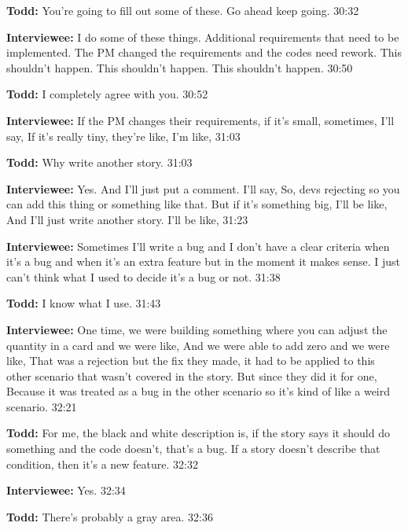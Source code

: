 \textbf{Todd:} You're going to fill out some of these. Go ahead keep going. 30:32

\textbf{Interviewee:} I do some of these things. Additional requirements that need to be implemented. The PM changed the requirements and the codes need rework. This shouldn't happen. This shouldn't happen. This shouldn't happen. 30:50

\textbf{Todd:} I completely agree with you. 30:52

\textbf{Interviewee:} If the PM changes their requirements, if it's small, sometimes, I'll say,  If it's really tiny, they're like,  I'm like,  31:03

\textbf{Todd:} Why write another story. 31:03

\textbf{Interviewee:} Yes. And I'll just put a comment. I'll say,  So, devs rejecting so you can add this thing or something like that. But if it's something big, I'll be like,  And I'll just write another story. I'll be like,  31:23

\textbf{Interviewee:} Sometimes I'll write a bug and I don't have a clear criteria when it's a bug and when it's an extra feature but in the moment it makes sense. I just can't think what I used to decide it's a bug or not. 31:38

\textbf{Todd:} I know what I use. 31:43

\textbf{Interviewee:} One time, we were building something where you can adjust the quantity in a card and we were like,  And we were able to add zero and we were like,  That was a rejection but the fix they made, it had to be applied to this other scenario that wasn't covered in the story. But since they did it for one,  Because it was treated as a bug in the other scenario so it's kind of like a weird scenario. 32:21

\textbf{Todd:} For me, the black and white description is, if the story says it should do something and the code doesn't, that's a bug. If a story doesn't describe that condition, then it's a new feature. 32:32

\textbf{Interviewee:} Yes. 32:34

\textbf{Todd:} There's probably a gray area. 32:36

